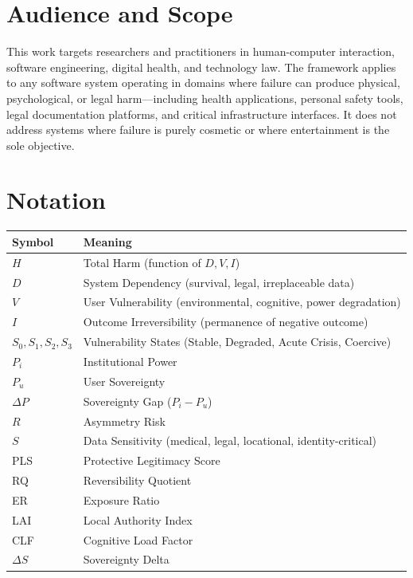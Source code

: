 \documentclass[12pt]{article}
\begin{document}
\section*{Audience and Scope}
This work targets researchers and practitioners in human-computer interaction, software engineering, digital health, and technology law. The framework applies to any software system operating in domains where failure can produce physical, psychological, or legal harm---including health applications, personal safety tools, legal documentation platforms, and critical infrastructure interfaces. It does not address systems where failure is purely cosmetic or where entertainment is the sole objective.

\section*{Notation}
\begin{center}
\begin{tabular}{@{}ll@{}}
\toprule
Symbol & Meaning \\
\midrule
$H$        & Total Harm (function of $D, V, I$) \\
$D$        & System Dependency (survival, legal, irreplaceable data) \\
$V$        & User Vulnerability (environmental, cognitive, power degradation) \\
$I$        & Outcome Irreversibility (permanence of negative outcome) \\
$S_0, S_1, S_2, S_3$ & Vulnerability States (Stable, Degraded, Acute Crisis, Coercive) \\
$P_i$      & Institutional Power \\
$P_u$      & User Sovereignty \\
$\Delta P$ & Sovereignty Gap ($P_i - P_u$) \\
$R$        & Asymmetry Risk \\
$S$        & Data Sensitivity (medical, legal, locational, identity-critical) \\
PLS        & Protective Legitimacy Score \\
RQ         & Reversibility Quotient \\
ER         & Exposure Ratio \\
LAI        & Local Authority Index \\
CLF        & Cognitive Load Factor \\
$\Delta S$ & Sovereignty Delta \\
\bottomrule
\end{tabular}
\end{center}
\end{document}

